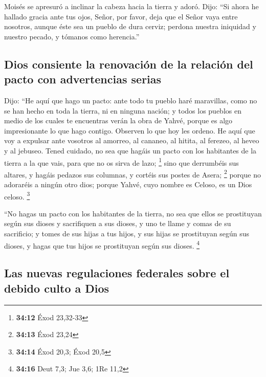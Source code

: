  Moisés se apresuró a inclinar la cabeza hacia la tierra y
adoró.  Dijo: ``Si ahora he hallado gracia ante tus ojos,
Señor, por favor, deja que el Señor vaya entre nosotros, aunque éste sea
un pueblo de dura cerviz; perdona nuestra iniquidad y nuestro pecado, y
tómanos como herencia.''

\hypertarget{dios-consiente-la-renovaciuxf3n-de-la-relaciuxf3n-del-pacto-con-advertencias-serias}{%
\subsection{Dios consiente la renovación de la relación del pacto con
advertencias
serias}\label{dios-consiente-la-renovaciuxf3n-de-la-relaciuxf3n-del-pacto-con-advertencias-serias}}

 Dijo: ``He aquí que hago un pacto: ante todo tu pueblo
haré maravillas, como no se han hecho en toda la tierra, ni en ninguna
nación; y todos los pueblos en medio de los cuales te encuentras verán
la obra de Yahvé, porque es algo impresionante lo que hago contigo.
 Observen lo que hoy les ordeno. He aquí que voy a
expulsar ante vosotros al amorreo, al cananeo, al hitita, al ferezeo, al
heveo y al jebuseo.  Tened cuidado, no sea que hagáis un
pacto con los habitantes de la tierra a la que vais, para que no os
sirva de lazo; \footnote{\textbf{34:12} Éxod 23,32-33} 
sino que derrumbéis sus altares, y hagáis pedazos sus columnas, y
cortéis sus postes de Asera; \footnote{\textbf{34:13} Éxod 23,24}
 porque no adoraréis a ningún otro dios; porque Yahvé,
cuyo nombre es Celoso, es un Dios celoso. \footnote{\textbf{34:14} Éxod
  20,3; Éxod 20,5}

 ``No hagas un pacto con los habitantes de la tierra, no
sea que ellos se prostituyan según sus dioses y sacrifiquen a sus
dioses, y uno te llame y comas de su sacrificio;  y tomes
de sus hijas a tus hijos, y sus hijas se prostituyan según sus dioses, y
hagas que tus hijos se prostituyan según sus dioses. \footnote{\textbf{34:16}
  Deut 7,3; Jue 3,6; 1Re 11,2}

\hypertarget{las-nuevas-regulaciones-federales-sobre-el-debido-culto-a-dios}{%
\subsection{Las nuevas regulaciones federales sobre el debido culto a
Dios}\label{las-nuevas-regulaciones-federales-sobre-el-debido-culto-a-dios}}

